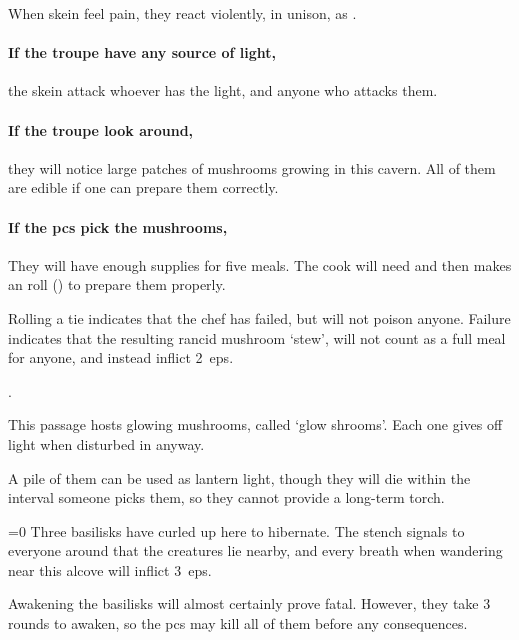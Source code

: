\begin{multicols}{2}
When skein feel pain, they react violently, in unison, as .

\skeinSwarm

\paragraph{If the troupe have any source of light,}
the skein attack whoever has the light, and anyone who attacks them.

\paragraph{If the troupe look around,}
they will notice large patches of mushrooms growing in this cavern.
All of them are edible if one can prepare them correctly.

\paragraph{If the \glspl{pc} pick the mushrooms,}
They will have enough supplies for five meals.
The cook will need  and then makes an  roll (\tn[10]) to prepare them properly.

Rolling a tie indicates that the chef has failed, but will not poison anyone.
Failure indicates that the resulting rancid mushroom `stew', will not count as a full meal for anyone, and instead inflict 2~\glspl{ep}.

.


This passage hosts glowing mushrooms, called `glow shrooms'.%
Each one gives off light when disturbed in anyway.

A pile of them can be used as lantern light, though they will die within the \gls{interval} someone picks them, so they cannot provide a long-term torch.


\ifnum\value{temperature}=0
  Three \glspl{basilisk} have curled up here to hibernate.
  The stench signals to everyone around that the creatures lie nearby, and every breath when wandering near this alcove will inflict 3~\glspl{ep}.

  Awakening the \glspl{basilisk} will almost certainly prove fatal.
  However, they take 3 rounds to awaken, so the \glspl{pc} may kill all of them before any consequences.


\end{multicols}
